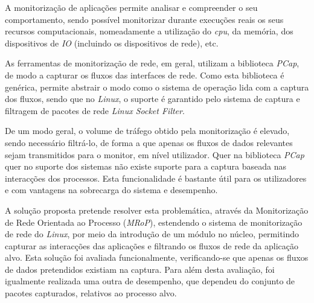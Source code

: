 \resumo 

A monitorização de aplicações permite analisar e compreender o seu comportamento, sendo possível monitorizar durante execuções reais os seus recursos computacionais, nomeadamente a utilização do \textit{cpu}, da memória, dos dispositivos de \textit{IO} (incluindo os dispositivos de rede), etc. 

As ferramentas de monitorização de rede, em geral, utilizam a biblioteca \textit{PCap}, de modo a capturar os fluxos das interfaces de rede.
Como esta biblioteca é genérica, permite abstrair o modo como o sistema de operação lida com a captura dos fluxos, sendo que no \textit{Linux}, o suporte é garantido pelo sistema de captura e filtragem de pacotes de rede \textit{Linux Socket Filter}.


De um modo geral, o volume de tráfego obtido pela monitorização é elevado, sendo necessário filtrá-lo, de forma a que apenas os fluxos de dados relevantes sejam transmitidos para o monitor, em nível utilizador.
Quer na biblioteca \textit{PCap} quer no suporte dos sistemas não existe suporte para a captura baseada nas interacções dos processos.
Esta funcionalidade é bastante útil para os utilizadores e com vantagens na sobrecarga do sistema e desempenho.

A solução proposta pretende resolver esta problemática, através da Monitorização de Rede Orientada ao Processo (\textit{MRoP}), estendendo o sistema de monitorização de rede do \textit{Linux}, por meio da introdução de um módulo no núcleo, permitindo capturar as interacções das aplicações e filtrando os fluxos de rede da aplicação alvo.
Esta solução foi avaliada funcionalmente, verificando-se que apenas os fluxos de dados pretendidos existiam na captura.
Para além desta avaliação, foi igualmente realizada uma outra de desempenho, que dependeu do conjunto de pacotes capturados, relativos ao processo alvo.






